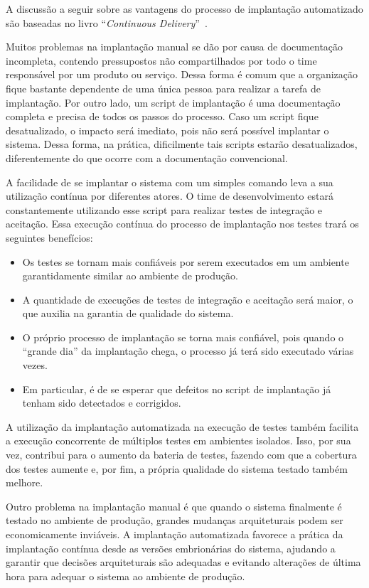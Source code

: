 A discussão a seguir sobre as vantagens do processo de implantação automatizado
são baseadas no livro ``\emph{Continuous Delivery}''~\cite{Humble2011Continuous}.

Muitos problemas na implantação manual se dão por causa de documentação incompleta,
contendo pressupostos não compartilhados por todo o time responsável por um produto ou serviço.
Dessa forma é comum que a organização fique bastante dependente de uma única
pessoa para realizar a tarefa de implantação.
Por outro lado, um script de implantação é uma documentação completa e precisa de todos os passos
do processo. Caso um script fique desatualizado, o impacto será imediato, pois
não será possível implantar o sistema. Dessa forma, na prática,
dificilmente tais scripts estarão desatualizados,
diferentemente do que ocorre com a documentação convencional.

A facilidade de se implantar o sistema com um simples comando
leva a sua utilização contínua por diferentes atores.
O time de desenvolvimento estará constantemente utilizando esse script 
para realizar testes de integração e aceitação. 
Essa execução contínua do processo de implantação nos testes trará os seguintes benefícios:

\begin{itemize}
\item Os testes se tornam mais confiáveis por serem executados em um ambiente garantidamente similar ao ambiente de produção.
\item A quantidade de execuções de testes de integração e aceitação será maior, o que auxilia na garantia de qualidade do sistema.
\item O próprio processo de implantação se torna mais confiável, pois quando o ``grande dia'' da implantação chega, o processo já terá sido executado várias vezes.
\item Em particular, é de se esperar que defeitos no script de implantação já tenham sido detectados e corrigidos.
\end{itemize}

A utilização da implantação automatizada na execução de testes também
facilita a execução concorrente de múltiplos testes em ambientes isolados.
Isso, por sua vez, contribui para o aumento da bateria de testes, fazendo com que
a cobertura dos testes aumente e, por fim, a própria qualidade do sistema testado também melhore.

Outro problema na implantação manual é que quando o sistema finalmente é testado
no ambiente de produção, grandes mudanças arquiteturais podem ser economicamente inviáveis.
A implantação automatizada favorece a prática da implantação contínua desde as versões
embrionárias do sistema, ajudando a garantir que decisões arquiteturais são adequadas
e evitando alterações de última hora para adequar o sistema ao ambiente de produção.

